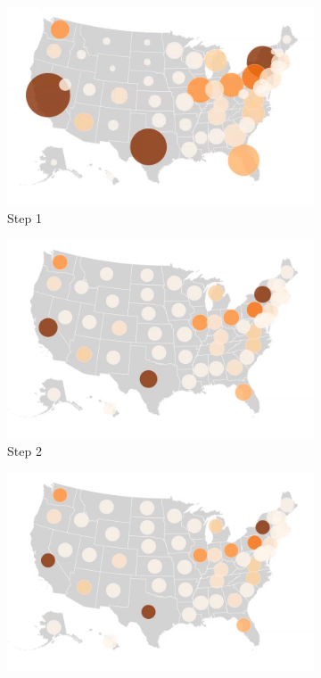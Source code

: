 \begin{figure}[!htb]
    \centering

    \begin{subfigure}[b]{0.31\textwidth}
        \centering
        \includegraphics[width=\textwidth]{images/results/psm_choropleth/step1.png}
        \caption[]%
        {{\small Step 1}}
    \end{subfigure}
    \hfill
    \begin{subfigure}[b]{0.31\textwidth}
        \centering
        \includegraphics[width=\textwidth]{images/results/psm_choropleth/step2.png}
        \caption[]%
        {{\small Step 2}}
    \end{subfigure}
    \hfill
    \begin{subfigure}[b]{0.31\textwidth}
        \centering
        \includegraphics[width=\textwidth]{images/results/psm_choropleth/step3.png}

\end{subfigure}
\end{figure}
